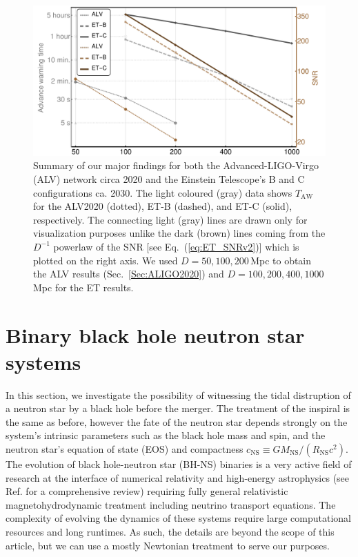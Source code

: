 \documentclass[prd,amsmath,amssymb,aps,floats,amsfonts,notitlepage,superscriptaddress,eqsecnum,nofootinbib,10pt]{revtex4-1}
\begin{document}
\begin{figure}[ht!]
\includegraphics[width=\linewidth]{../Figures/Main_results.pdf}
\caption{Summary of our major findings for both the Advanced-LIGO-Virgo (ALV) network circa 2020 and the Einstein Telescope's B and C configurations
ca. 2030. The light coloured (gray) data shows $T_\text{AW}$ for the ALV2020 (dotted), ET-B (dashed), and ET-C (solid), respectively.
The connecting light (gray) lines are drawn only for visualization purposes unlike the dark (brown) lines coming from the $D^{-1}$ powerlaw of the SNR [see Eq.~(\ref{eq:ET_SNRv2})] which is plotted on the right axis. 
We used $D=50,100,200\,$Mpc to obtain the ALV results (Sec.~\ref{Sec:ALIGO2020}) and $D=100,200,400,1000\,$Mpc for the ET results.}\label{fig:summary}
\end{figure}
%
%
%
%
%
\section{Binary black hole neutron star systems}\label{sec:BH_NS}
In this section, we investigate the possibility of witnessing the tidal distruption of a neutron star by a black hole before the merger.
The treatment of the inspiral is the same as before, however the fate of the neutron star depends strongly on the system's intrinsic parameters
such as the black hole mass and spin, and the neutron star's equation of state (EOS) and compactness $c_\text{NS}\equiv G M_\text{NS}/(R_\text{NS}c^2)$. 
The evolution of black hole-neutron star (BH-NS) binaries is a very active field of research at the interface of numerical relativity and high-energy astrophysics
(see Ref. \cite{Shibata:2011jka} for a comprehensive review) requiring fully general relativistic magnetohydrodynamic treatment including neutrino transport equations.
The complexity of evolving the dynamics of these systems require large computational resources and long runtimes.
As such, the details are beyond the scope of this article, but we can use a mostly Newtonian treatment to serve our purposes. %
\end{document}
